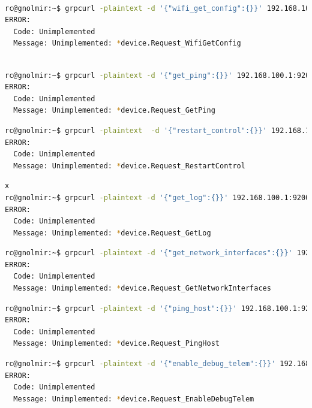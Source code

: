 \documentclass[IN,11pt,twoside,openright,idp,english]{tumthesis}
\begin{document}
\begin{lstlisting}[language=bash,basicstyle=\tiny]

rc@gnolmir:~$ grpcurl -plaintext -d '{"wifi_get_config":{}}' 192.168.100.1:9200 SpaceX.API.Device.Device/Handle
ERROR:
  Code: Unimplemented
  Message: Unimplemented: *device.Request_WifiGetConfig
\end{lstlisting}
\begin{lstlisting}[language=bash,basicstyle=\tiny]
 
rc@gnolmir:~$ grpcurl -plaintext -d '{"get_ping":{}}' 192.168.100.1:9200 SpaceX.API.Device.Device/Handle
ERROR:
  Code: Unimplemented
  Message: Unimplemented: *device.Request_GetPing
\end{lstlisting}

\begin{lstlisting}[language=bash,basicstyle=\tiny]
rc@gnolmir:~$ grpcurl -plaintext  -d '{"restart_control":{}}' 192.168.100.1:9200 SpaceX.API.Device.Device/Handle
ERROR:
  Code: Unimplemented
  Message: Unimplemented: *device.Request_RestartControl
\end{lstlisting}

\begin{lstlisting}[language=bash,basicstyle=\tiny]x
rc@gnolmir:~$ grpcurl -plaintext -d '{"get_log":{}}' 192.168.100.1:9200 SpaceX.API.Device.Device/Handle
ERROR:
  Code: Unimplemented
  Message: Unimplemented: *device.Request_GetLog
\end{lstlisting}

\begin{lstlisting}[language=bash,basicstyle=\tiny]
rc@gnolmir:~$ grpcurl -plaintext -d '{"get_network_interfaces":{}}' 192.168.100.1:9200 SpaceX.API.Device.Device/Handle
ERROR:
  Code: Unimplemented
  Message: Unimplemented: *device.Request_GetNetworkInterfaces
\end{lstlisting}

\begin{lstlisting}[language=bash,basicstyle=\tiny]
rc@gnolmir:~$ grpcurl -plaintext -d '{"ping_host":{}}' 192.168.100.1:9200 SpaceX.API.Device.Device/Handle
ERROR:
  Code: Unimplemented
  Message: Unimplemented: *device.Request_PingHost
\end{lstlisting}

\begin{lstlisting}[language=bash,basicstyle=\tiny]
rc@gnolmir:~$ grpcurl -plaintext -d '{"enable_debug_telem":{}}' 192.168.100.1:9200 SpaceX.API.Device.Device/Handle
ERROR:
  Code: Unimplemented
  Message: Unimplemented: *device.Request_EnableDebugTelem
\end{lstlisting}
\end{document}

